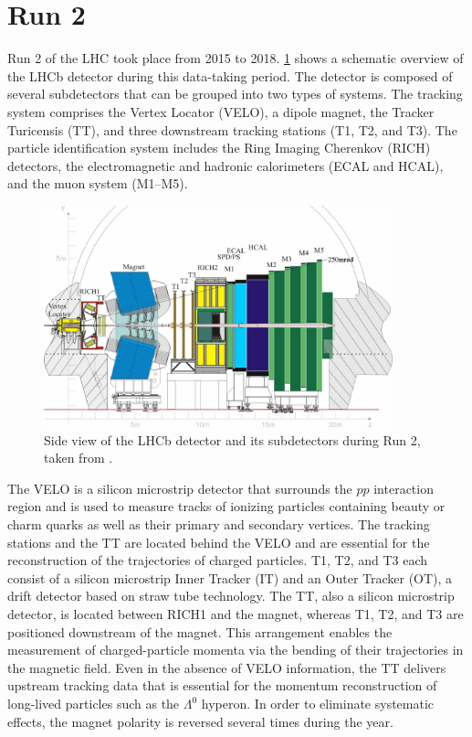 \section{Run 2}
\label{sec:lhcb_run2}
Run 2 of the LHC took place from 2015 to 2018. \cref{fig:lhcb_run2} shows a schematic overview of the LHCb detector during this data-taking period. The detector is composed of several subdetectors that can be grouped into two types of systems. The tracking system comprises the Vertex Locator (VELO), a dipole magnet, the Tracker Turicensis (TT), and three downstream tracking stations (T1, T2, and T3). The particle identification system includes the Ring Imaging Cherenkov (RICH) detectors, the electromagnetic and hadronic calorimeters (ECAL and HCAL), and the muon system (M1–M5). 
\begin{figure}
    \centering
    \includegraphics[width=0.9\textwidth]{figures/lhcb_run2.png}
    \caption{Side view of the LHCb detector and its subdetectors during Run 2, taken from \cite{calabrese2022_rich_run2}.}
    \label{fig:lhcb_run2}
\end{figure}

The VELO is a silicon microstrip detector that surrounds the $pp$ interaction region and is used to measure tracks of ionizing particles containing beauty or charm quarks as well as their primary and secondary vertices. The tracking stations and the TT are located behind the VELO and are essential for
the reconstruction of the trajectories of charged particles. T1, T2, and T3 each consist of a silicon microstrip Inner Tracker (IT) and an Outer Tracker (OT), a drift detector based on straw tube technology. The TT, also a silicon microstrip detector, is located between RICH1 and the magnet, whereas T1, T2, and T3 are positioned downstream of the magnet. This arrangement enables the measurement of charged-particle momenta via the bending of their trajectories in the magnetic field. Even in the absence of VELO information, the TT delivers upstream tracking data that is essential for the momentum reconstruction of long-lived particles such as the $\Lambda^0$ hyperon. In order to eliminate systematic effects, the magnet polarity is reversed several times during the year.

